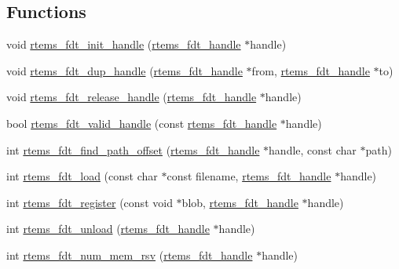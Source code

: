 \subsection*{Functions}
\begin{DoxyCompactItemize}
\item 
void \mbox{\hyperlink{rtems-fdt_8h_a3315346f05c8e25cd84b62626f249da4}{rtems\+\_\+fdt\+\_\+init\+\_\+handle}} (\mbox{\hyperlink{structrtems__fdt__handle}{rtems\+\_\+fdt\+\_\+handle}} $\ast$handle)
\item 
void \mbox{\hyperlink{rtems-fdt_8h_a7345cc5334e1afde88e13f65ddb68f12}{rtems\+\_\+fdt\+\_\+dup\+\_\+handle}} (\mbox{\hyperlink{structrtems__fdt__handle}{rtems\+\_\+fdt\+\_\+handle}} $\ast$from, \mbox{\hyperlink{structrtems__fdt__handle}{rtems\+\_\+fdt\+\_\+handle}} $\ast$to)
\item 
void \mbox{\hyperlink{rtems-fdt_8h_aef15751554a2804bbde895bf07dffe80}{rtems\+\_\+fdt\+\_\+release\+\_\+handle}} (\mbox{\hyperlink{structrtems__fdt__handle}{rtems\+\_\+fdt\+\_\+handle}} $\ast$handle)
\item 
bool \mbox{\hyperlink{rtems-fdt_8h_aabed205ff98f5b2ae70709106b8cd8f2}{rtems\+\_\+fdt\+\_\+valid\+\_\+handle}} (const \mbox{\hyperlink{structrtems__fdt__handle}{rtems\+\_\+fdt\+\_\+handle}} $\ast$handle)
\item 
int \mbox{\hyperlink{rtems-fdt_8h_a82ee27464217327e0e7fb40ef60a48ac}{rtems\+\_\+fdt\+\_\+find\+\_\+path\+\_\+offset}} (\mbox{\hyperlink{structrtems__fdt__handle}{rtems\+\_\+fdt\+\_\+handle}} $\ast$handle, const char $\ast$path)
\item 
int \mbox{\hyperlink{rtems-fdt_8h_ade27ea157b92bb17f531baae94571c5b}{rtems\+\_\+fdt\+\_\+load}} (const char $\ast$const filename, \mbox{\hyperlink{structrtems__fdt__handle}{rtems\+\_\+fdt\+\_\+handle}} $\ast$handle)
\item 
int \mbox{\hyperlink{rtems-fdt_8h_ad6903d840a58d8b99ede97ac20bd94af}{rtems\+\_\+fdt\+\_\+register}} (const void $\ast$blob, \mbox{\hyperlink{structrtems__fdt__handle}{rtems\+\_\+fdt\+\_\+handle}} $\ast$handle)
\item 
int \mbox{\hyperlink{rtems-fdt_8h_af6f1e782f453d0e9f42afa462803a350}{rtems\+\_\+fdt\+\_\+unload}} (\mbox{\hyperlink{structrtems__fdt__handle}{rtems\+\_\+fdt\+\_\+handle}} $\ast$handle)
\item 
int \mbox{\hyperlink{rtems-fdt_8h_afded44117e8bf86b1fa32164b081f3bb}{rtems\+\_\+fdt\+\_\+num\+\_\+mem\+\_\+rsv}} (\mbox{\hyperlink{structrtems__fdt__handle}{rtems\+\_\+fdt\+\_\+handle}} $\ast$handle)
\item 

\end{DoxyCompactItemize}
